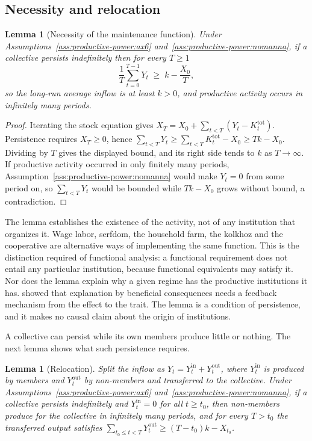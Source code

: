 \documentclass[11pt,letterpaper]{article}
\newtheorem{lemma}[theorem]{Lemma}
\theoremstyle{definition}
\theoremstyle{remark}
\begin{document}
\subsection{Necessity and relocation}

\begin{lemma}[Necessity of the maintenance function]
\label{thm:productive-power:necessity}
Under Assumptions~\ref{ass:productive-power:ax6} and~\ref{ass:productive-power:nomanna}, if a collective persists indefinitely then for every $T\ge 1$
\[
\frac{1}{T}\sum_{t=0}^{T-1}Y_t\;\ge\;k-\frac{X_0}{T},
\]
so the long-run average inflow is at least $k>0$, and productive activity occurs in infinitely many periods.
\end{lemma}

\begin{proof}
Iterating the stock equation gives $X_T=X_0+\sum_{t<T}(Y_t-K^{\mathrm{tot}}_t)$. Persistence requires $X_T\ge 0$, hence $\sum_{t<T}Y_t\ge\sum_{t<T}K^{\mathrm{tot}}_t-X_0\ge Tk-X_0$. Dividing by $T$ gives the displayed bound, and its right side tends to $k$ as $T\to\infty$. If productive activity occurred in only finitely many periods, Assumption~\ref{ass:productive-power:nomanna} would make $Y_t=0$ from some period on, so $\sum_{t<T}Y_t$ would be bounded while $Tk-X_0$ grows without bound, a contradiction.
\end{proof}

The lemma establishes the existence of the activity, not of any institution that organizes it. Wage labor, serfdom, the household farm, the kolkhoz and the cooperative are alternative ways of implementing the same function. This is the distinction \citet{hempel1959} required of functional analysis: a functional requirement does not entail any particular institution, because functional equivalents may satisfy it. Nor does the lemma explain why a given regime has the productive institutions it has. \citet{elster1983} showed that explanation by beneficial consequences needs a feedback mechanism from the effect to the trait. The lemma is a condition of persistence, and it makes no causal claim about the origin of institutions.

A collective can persist while its own members produce little or nothing. The next lemma shows what such persistence requires.

\begin{lemma}[Relocation]
\label{lem:productive-power:relocation}
Split the inflow as $Y_t=Y^{\mathrm{in}}_t+Y^{\mathrm{out}}_t$, where $Y^{\mathrm{in}}_t$ is produced by members and $Y^{\mathrm{out}}_t$ by non-members and transferred to the collective. Under Assumptions~\ref{ass:productive-power:ax6} and~\ref{ass:productive-power:nomanna}, if a collective persists indefinitely and $Y^{\mathrm{in}}_t=0$ for all $t\ge t_0$, then non-members produce for the collective in infinitely many periods, and for every $T>t_0$ the transferred output satisfies $\sum_{t_0\le t<T}Y^{\mathrm{out}}_t\ge (T-t_0)k-X_{t_0}$.
\end{lemma}
\end{document}
